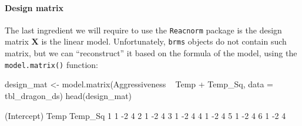 \documentclass[a4paper,12pt,twoside]{article}
\begin{document}
\paragraph{Design matrix}
The last ingredient we will require to use the \texttt{Reacnorm} package is the design matrix $\mathbf{X}$ is the linear model. Unfortunately, \texttt{brms} objects do not contain such matrix, but we can ``reconstruct'' it based on the formula of the model, using the \texttt{model.matrix()} function:
\begin{Rinput}
design_mat <- model.matrix(Aggressiveness ~ Temp + Temp_Sq, data = tbl_dragon_ds)
head(design_mat)
\end{Rinput}
\begin{Routput}
  (Intercept) Temp Temp_Sq
1           1   -2       4
2           1   -2       4
3           1   -2       4
4           1   -2       4
5           1   -2       4
6           1   -2       4
\end{Routput}
\end{document}
